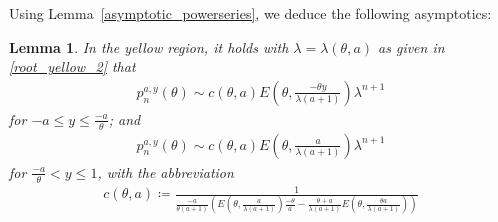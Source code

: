 \documentclass[12pt]{article}
\newcommand{\1}{\mathds{1}}
\theoremstyle{definition}
\theoremstyle{plain}
\newtheorem{Lemma}[definition]{Lemma}
\theoremstyle{remark}
\begin{document}
Using Lemma~\ref{asymptotic_powerseries}, we deduce the following asymptotics:
\begin{Lemma}\label{asymptotic_gelb_eigenfunction}
    In the yellow region, it holds with $\lambda=\lambda(\theta,a)$ as given in \eqref{root_yellow_2} that
    \begin{align*}
       p_n^{a,y}(\theta)\sim c(\theta,a)E\left(\theta,\frac{-\theta y}{\lambda(a+1)}\right)\lambda^{n+1}
   \end{align*}
   for $-a\leq y \leq \frac{-a}{\theta}$; and 
   \begin{align*}
       p_n^{a,y}(\theta)\sim c(\theta,a)E\left(\theta,\frac{a}{\lambda(a+1)}\right)\lambda^{n+1}
   \end{align*}
   for $\frac{-a}{\theta}<y\leq1$, with the abbreviation
    \begin{align*}
       c(\theta, a)\coloneqq\frac{1}{\frac{-a}{\theta(a+1)}\left(E\left(\theta,\frac{a}{\lambda(a+1)}\right)\frac{-\theta}{a}- \frac{\theta +a}{\lambda(a+1)}
        E\left(\theta,\frac{\theta a}{\lambda(a+1)}\right)\right)} %
   \end{align*}
   \end{Lemma}
\end{document}
